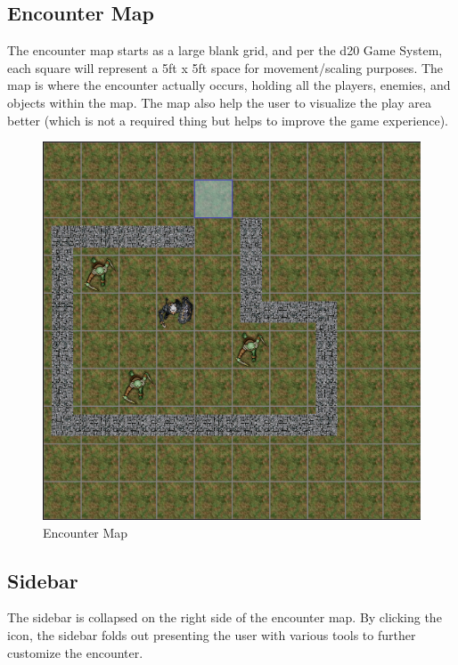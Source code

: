\documentclass[12pt,a4paper]{report}
\begin{document}
		\subsection{Encounter Map}
		The encounter map starts as a large blank grid, and per the d20 Game System, each square will represent a 5ft x 5ft space for movement/scaling purposes. The map is where the encounter actually occurs, holding all the players, enemies, and objects within the map. The map also help the user to visualize the play area better (which is not a required thing but helps to improve the game experience).
		\begin{figure}[H]
			\centering
			\includegraphics[scale=.5]{environment}
			\caption{Encounter Map}
			\label{fig: Encounter Map}
		\end{figure}
		\newpage
		\subsection{Sidebar}
		The sidebar is collapsed on the right side of the encounter map. By clicking the icon, the sidebar folds out presenting the user with various tools to further customize the encounter.
\end{document}
